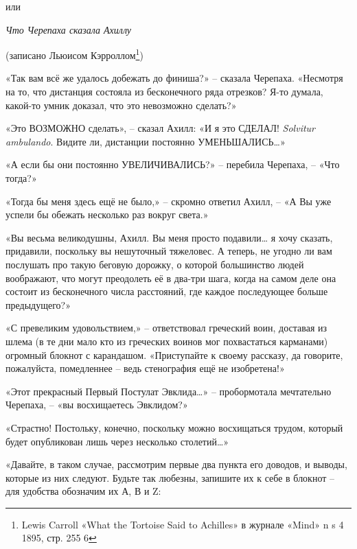 \documentclass[../main.tex]{subfiles}
\begin{document}

\par\begingroup\centering\Large%
    или

    \emph{Что Черепаха сказала Ахиллу}

    \large%
    (записано Льюисом Кэрроллом\footnote{Lewis Carroll «What the Tortoise Said to Achilles» в журнале «Mind» n s 4 1895, стр. 255 6})
\par\endgroup


\begin{Dialogue}

«Так вам всё же удалось добежать до финиша?» \--- сказала Черепаха. «Несмотря на то, что дистанция состояла из бесконечного ряда отрезков? Я-то думала, какой-то умник доказал, что это невозможно сделать?»

«Это ВОЗМОЖНО сделать», \--- сказал Ахилл: «И я это СДЕЛАЛ! \emph{Solvitur ambulando}. Видите ли, дистанции постоянно УМЕНЬШАЛИСЬ\ldots»

«А если бы они постоянно УВЕЛИЧИВАЛИСЬ?» \--- перебила Черепаха, \--- «Что тогда?»

«Тогда бы меня здесь ещё не было,» \--- скромно ответил Ахилл, \--- «А Вы уже успели бы обежать несколько раз вокруг света.»

«Вы весьма великодушны, Ахилл. Вы меня просто подавили\ldots{} я хочу сказать, придавили, поскольку вы нешуточный тяжеловес. А теперь, не угодно ли вам послушать про такую беговую дорожку, о которой большинство людей воображают, что могут преодолеть её в два-три шага, когда на самом деле она состоит из бесконечного числа расстояний, где каждое последующее больше предыдущего?»

«С превеликим удовольствием,» \--- ответствовал греческий воин, доставая из шлема (в те дни мало кто из греческих воинов мог похвастаться карманами) огромный блокнот с карандашом. «Приступайте к своему рассказу, да говорите, пожалуйста, помедленнее \--- ведь стенография ещё не изобретена!»

«Этот прекрасный Первый Постулат Эвклида\ldots» \--- пробормотала мечтательно Черепаха, \--- «вы восхищаетесь Эвклидом?»

«Страстно! Постольку, конечно, поскольку можно восхищаться трудом, который будет опубликован лишь через несколько столетий\ldots»

«Давайте, в таком случае, рассмотрим первые два пункта его доводов, и выводы, которые из них следуют. Будьте так любезны, запишите их к себе в блокнот \--- для удобства обозначим их А, В и Z:


\end{Dialogue}
\end{document}
